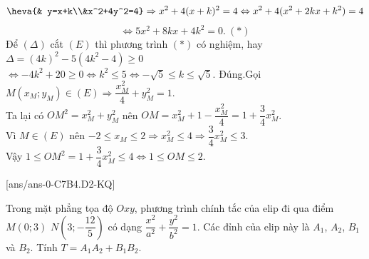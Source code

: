 \begin{ex}
{\begin{itemchoice}
			$$\heva{& y=x+k\\&x^2+4y^2=4}\Rightarrow x^2+4(x+k)^2=4\Leftrightarrow x^2+4(x^2+2kx+k^2)=4$$
			$$\Leftrightarrow 5x^2+8kx+4k^2 =0.\ (*)$$
			Để $(\Delta)$ cắt $(E)$ thì phương trình $(*)$ có nghiệm, hay $\Delta =(4k)^2-5(4k^2-4)\ge 0$\\
			$\Leftrightarrow -4k^2+20\ge 0 \Leftrightarrow k^2\le 5 \Leftrightarrow-\sqrt{5}\le k \le \sqrt{5} $.
			\itemch Đúng.Gọi $M(x_M;y_M)\in (E)\Rightarrow \dfrac{x_M^2}{4}+y_M^2=1$.\\
			Ta lại có $OM^2=x_M^2+y_M^2$ nên $OM=x_M^2+1-\dfrac{x_M^2}{4}=1+\dfrac{3}{4}x_M^2$.\\
			Vì $M\in (E)$ nên $-2\le x_M\le 2\Rightarrow x_M^2\le 4\Rightarrow\dfrac{3}{4}x_M^2\le 3$.\\
			Vậy $1\le OM^2=1+\dfrac{3}{4}x_M^2\le 4\Leftrightarrow 1\le OM\le 2$.
		\end{itemchoice}			
	}
\end{ex}


[ans/ans-0-C7B4.D2-KQ]
\caukq
\begin{ex}%
	Trong mặt phẳng tọa độ $Oxy$, phương trình chính tắc của elip đi qua điểm $M(0;3)$ $N\left(3;-\dfrac{12}{5}\right)$ có dạng $\dfrac{x^2}{a^2}+\dfrac{y^2}{b^2}=1$. Các đỉnh của elip này là $A_1$, $A_2$, $B_1$ và $B_2$. Tính $T=A_1A_2+B_1B_2$.
\end{ex}

